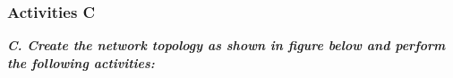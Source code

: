 \documentclass[a4paper,11pt]{article}
\begin{document}
%

%

%



\subsubsection{Activities C}

{\bfseries \textit{C. Create the network topology as shown in figure below and perform the following activities:}}
\end{document}
